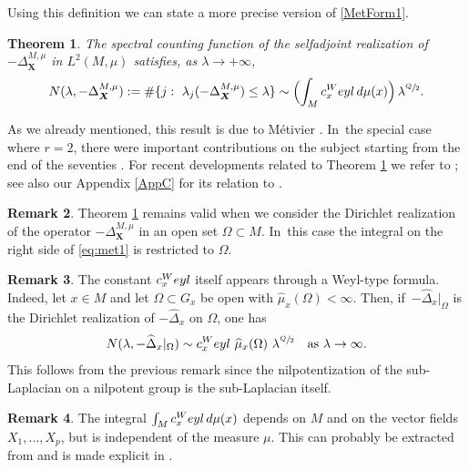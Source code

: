 \documentclass[11pt]{article}
\let\oldsfrac\sfrac
\renewcommand{\sfrac}[2]{{\oldsfrac{#1}{#2}}}
\newcommand{\Weyl}{\textup{Weyl}}
\newcommand{\bX}{{\boldsymbol{X}}}
\newtheorem{theorem}{Theorem}[section]
\theoremstyle{definition}
\newtheorem{remark}[theorem]{Remark}
\let\Xb\bX
\newcommand{\1}{\mathbbm{1}}
\numberwithin{equation}{section}
\begin{document}
Using this definition we can state a more precise version of \eqref{MetForm1}.

\begin{theorem}\label{weylmet}
The spectral counting function of the selfadjoint realization of $-\Delta^{M,\mu}_\bX$ in $L^2(M,\mu)$ satisfies, as $\lambda\to +\infty$,
\begin{equation}\label{eq:met1}
N(\lambda,-\Delta_{\Xb}^{M,\mu}):= \# \{j:\ \lambda_j (-\Delta_{\Xb}^{M,\mu}) \leq \lambda\} \sim \Bigl(\int_M c_x^\Weyl \,d\mu(x) \Bigr)\,\lambda^{\sfrac Q2}.
\end{equation}
\end{theorem}

As we already mentioned, this result is due to Métivier \cite{Me}. In~the special case where $r=2$, there were important contributions on the subject starting from the end of the seventies \cite{MS1,MS2,Mo}. For recent developments related to Theorem \ref{weylmet} we refer to \cite{CHT0,CHT,CHT1}; see also our Appendix \ref{AppC} for its relation to \cite{CHT1}.

\begin{remark}\label{rem:weylsubsets}
Theorem \ref{weylmet} remains valid when we consider the Dirichlet realization of the operator $-\Delta_{\Xb}^{M,\mu}$ in an open set $\Omega\subset M$. In~this case the integral on the right side of \eqref{eq:met1} is restricted to $\Omega$.
\end{remark}

\begin{remark}
The constant $c_x^\Weyl$ itself appears through a Weyl-type formula. Indeed, let $x\in M$ and let $\Omega\subset G_x$ be open with $\widehat\mu_x(\Omega)<\infty$. Then, if~$-\widehat\Delta_x|_\Omega$ is the Dirichlet realization of $-\widehat \Delta_x$ on $\Omega$, one has
\[
N(\lambda,-\widehat\Delta_x|_\Omega) \sim c_x^\Weyl \ \widehat\mu_x(\Omega) \ \lambda^{\sfrac Q2}
\quad\text{as}\ \lambda\to\infty.
\]
This follows from the previous remark since the nilpotentization of the sub-Laplacian on a nilpotent group is the sub-Laplacian itself.
\end{remark}

\begin{remark}\label{rem:weylindepmeas}
The integral $\int_M c_x^\Weyl \,d\mu(x)$ depends on $M$ and on the vector fields $X_1,\ldots, X_p$, but is independent of the measure $\mu$. This can probably be extracted from \cite{Me} and is made explicit in \cite[\S 2.1]{CHT1}.
\end{remark}
\end{document}
